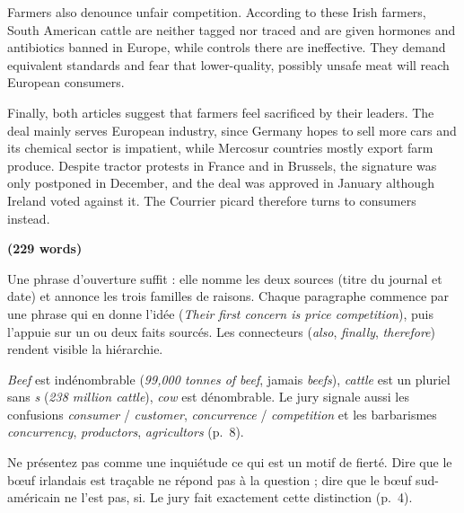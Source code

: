 \documentclass[11pt,a4paper]{article}
\begin{document}
Farmers also denounce unfair competition. According to these Irish farmers, South American cattle are neither tagged nor traced and are given hormones and antibiotics banned in Europe, while controls there are ineffective. They demand equivalent standards and fear that lower-quality, possibly unsafe meat will reach European consumers.

Finally, both articles suggest that farmers feel sacrificed by their leaders. The deal mainly serves European industry, since Germany hopes to sell more cars and its chemical sector is impatient, while Mercosur countries mostly export farm produce. Despite tractor protests in France and in Brussels, the signature was only postponed in December, and the deal was approved in January although Ireland voted against it. The Courrier picard therefore turns to consumers instead.

\textbf{(229 words)}

\begin{methode}

Une phrase d'ouverture suffit : elle nomme les deux sources (titre du journal et date) et annonce les trois familles de raisons. Chaque paragraphe commence par une phrase qui en donne l'idée (\emph{Their first concern is price competition}), puis l'appuie sur un ou deux faits sourcés. Les connecteurs (\emph{also}, \emph{finally}, \emph{therefore}) rendent visible la hiérarchie.

\end{methode}

\begin{piege}

\emph{Beef} est indénombrable (\emph{99,000 tonnes of beef}, jamais \emph{beefs}), \emph{cattle} est un pluriel sans \emph{s} (\emph{238 million cattle}), \emph{cow} est dénombrable. Le jury signale aussi les confusions \emph{consumer} / \emph{customer}, \emph{concurrence} / \emph{competition} et les barbarismes \emph{concurrency}, \emph{productors}, \emph{agricultors} (p.~8).

\end{piege}

\begin{piege}

Ne présentez pas comme une inquiétude ce qui est un motif de fierté. Dire que le bœuf irlandais est traçable ne répond pas à la question ; dire que le bœuf sud-américain ne l'est pas, si. Le jury fait exactement cette distinction (p.~4).

\end{piege}
\end{document}
